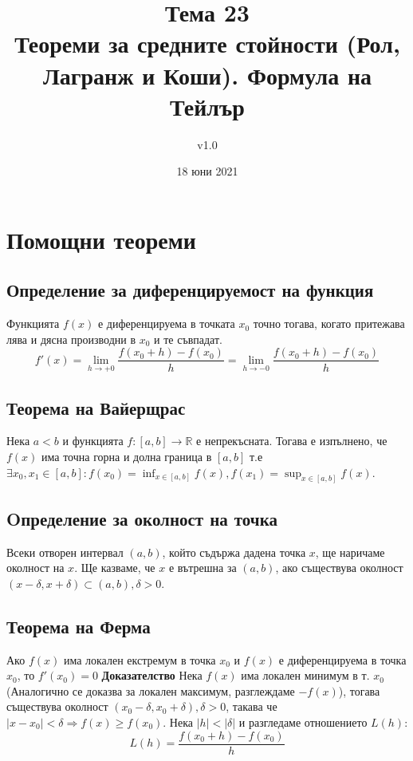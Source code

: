 \documentclass[fleqn,12pt]{article}
\title{Тема 23\\ Теореми  за  средните  стойности  (Рол,  Лагранж  и  Коши).  Формула  на Тейлър}
\author{v1.0}
\date{18 юни 2021}
\begin{document}
    
\maketitle

\tableofcontents
\pagebreak
    
\section{Помощни теореми}

\subsection{Определение за диференцируемост на функция}
Функцията $f(x)$ е диференцируема в точката $x_0$ точно тогава, когато притежава лява и дясна производни в $x_0$ и те съвпадат.
\[f'(x) = \lim_{h \to +0} \frac{f(x_0 + h)-f(x_0)}{h} = \lim_{h \to -0} \frac{ f(x_0 + h)-f(x_0)}{h}\]

\subsection{Теорема на Вайерщрас}
Нека $a<b$ и функцията $f:[a,b]\rightarrow\mathbb{R}$ е непрекъсната. Тогава е изпълнено, че $f(x)$ има точна горна и долна граница в $[a,b]$
т.е $\exists x_0,x_1 \in [a,b]: f(x_0)=\inf_{x \in [a,b]} f(x), f(x_1)=\sup_{x \in [a,b]} f(x)$.

\subsection{Oпределение за околност на точка}
Всеки отворен интервал $(a,b)$, който съдържа дадена точка $x$, ще наричаме околност на $x$. Ще казваме, че $x$ е вътрешна за $(a,b)$, ако
съществува околност $(x-\delta,x+\delta) \subset (a,b), \delta > 0$.

\subsection{Теорема на Ферма}
Ако $f(x)$ има локален екстремум в точка $x_0$ и $f(x)$ е диференцируема в точка $x_0$, то $f'(x_0)=0$
\bigbreak
\textbf{Доказателство}
Нека $f(x)$ има локален минимум в т. $x_0$ (Аналогично се доказва за локален максимум, разглеждаме $-f(x)$),
тогава съществува околност $(x_0 - \delta,x_0 + \delta), \delta > 0$, такава че $|x-x_0| < \delta \Rightarrow f(x) \geq f(x_0)$.
Нека $|h| < |\delta|$ и разгледаме отношението $L(h)$:
\[ L(h) = \frac{f(x_0 + h) - f(x_0)}{h} \]
\end{document}
